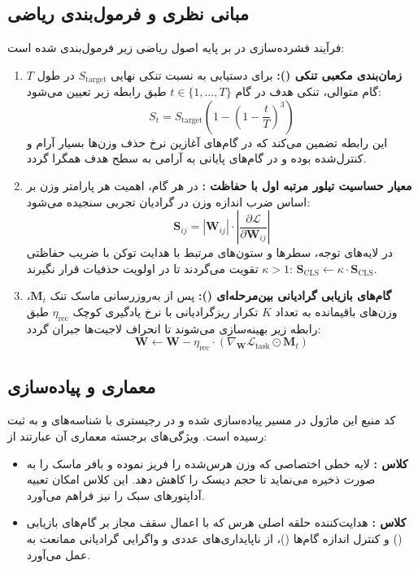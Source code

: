 \subsection{مبانی نظری و فرمول‌بندی ریاضی}
فرآیند فشرده‌سازی در  بر پایه اصول ریاضی زیر فرمول‌بندی شده است:
\begin{enumerate}
    \item \textbf{زمان‌بندی مکعبی تنکی ():} برای دستیابی به نسبت تنکی نهایی $S_{\text{target}}$ در طول $T$ گام متوالی، تنکی هدف در گام $t \in \{1, \dots, T\}$ طبق رابطه زیر تعیین می‌شود:
    \begin{equation}
    S_t = S_{\text{target}} \left( 1 - \left( 1 - \frac{t}{T} \right)^3 \right)
    \end{equation}
    این رابطه تضمین می‌کند که در گام‌های آغازین نرخ حذف وزن‌ها بسیار آرام و کنترل‌شده بوده و در گام‌های پایانی به آرامی به سطح هدف همگرا گردد.
    \item \textbf{معیار حساسیت تیلور مرتبه اول با حفاظت \lr{[CLS]}:} در هر گام، اهمیت هر پارامتر وزن بر اساس ضرب اندازه وزن در گرادیان تجربی سنجیده می‌شود:
    \begin{equation}
    \mathbf{S}_{ij} = |\mathbf{W}_{ij}| \cdot \left| \frac{\partial \mathcal{L}}{\partial \mathbf{W}_{ij}} \right|
    \end{equation}
    در لایه‌های توجه، سطرها و ستون‌های مرتبط با هدایت توکن \lr{[CLS]} با ضریب حفاظتی $\kappa > 1$ تقویت می‌گردند تا در اولویت حذفیات قرار نگیرند: $\mathbf{S}_{\text{CLS}} \leftarrow \kappa \cdot \mathbf{S}_{\text{CLS}}$.
    \item \textbf{گام‌های بازیابی گرادیانی بین‌مرحله‌ای ():} پس از به‌روزرسانی ماسک تنک $\mathbf{M}_t$، وزن‌های باقیمانده به تعداد $K$ تکرار ریزگرادیانی با نرخ یادگیری کوچک $\eta_{\text{rec}}$ طبق رابطه زیر بهینه‌سازی می‌شوند تا انحراف لاجیت‌ها جبران گردد:
    \begin{equation}
    \mathbf{W} \leftarrow \mathbf{W} - \eta_{\text{rec}} \cdot \left( \nabla_{\mathbf{W}} \mathcal{L}_{\text{task}} \odot \mathbf{M}_t \right)
    \end{equation}
\end{enumerate}

\subsection{معماری و پیاده‌سازی}
کد منبع این ماژول در مسیر  پیاده‌سازی شده و در رجیستری با شناسه‌های  و  به ثبت رسیده است. ویژگی‌های برجسته معماری آن عبارتند از:
\begin{itemize}
    \item \textbf{کلاس :} لایه خطی اختصاصی که وزن هرس‌شده را فریز نموده و بافر ماسک را به صورت  ذخیره می‌نماید تا حجم دیسک را کاهش دهد. این کلاس امکان تعبیه آداپتورهای سبک  را نیز فراهم می‌آورد.
    \item \textbf{کلاس :} هدایت‌کننده حلقه اصلی هرس که با اعمال سقف مجاز بر گام‌های بازیابی () و کنترل اندازه گام‌ها ()، از ناپایداری‌های عددی و واگرایی گرادیانی ممانعت به عمل می‌آورد.
\end{itemize}

